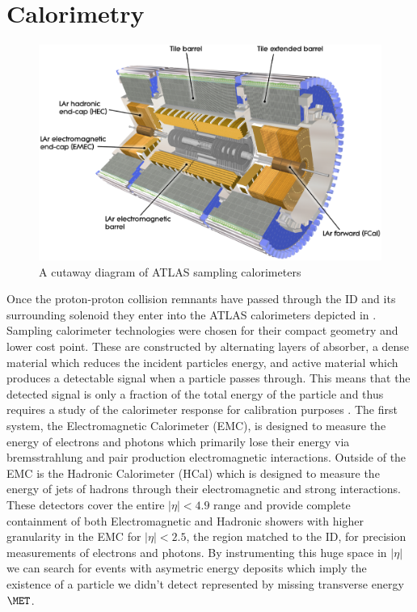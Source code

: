 \section{Calorimetry} \label{sec:atlas:calorimetry}

\begin{figure}[!htbp]
  \begin{center}
    \includegraphics[width=0.8\linewidth]{figures/atlas/calorimeter_cutaway}
    \caption{ \cite{PERF-2007-01} A cutaway diagram of ATLAS sampling calorimeters}
    \label{fig:calorimeter_cutaway}
  \end{center}
\end{figure}

Once the proton-proton collision remnants have passed through the ID and its
surrounding solenoid they enter into the ATLAS calorimeters depicted in
.  Sampling calorimeter technologies were chosen
for their compact geometry and lower cost point.  These are constructed by
alternating layers of absorber, a dense material which reduces the incident
particles energy, and active material which produces a detectable signal when a
particle passes through.  This means that the detected signal is only a fraction
of the total energy of the particle and thus requires a study of the calorimeter
response for calibration purposes \cite{Fabjan:692252}. The first system, the
Electromagnetic Calorimeter (EMC), is designed to measure the energy of
electrons and photons which primarily lose their energy via bremsstrahlung and
pair production electromagnetic interactions.  Outside of the EMC is the
Hadronic Calorimeter (HCal) which is designed to measure the energy of jets of
hadrons through their electromagnetic and strong interactions. These detectors
cover the entire $|\eta| < 4.9$ range and provide complete containment of both
Electromagnetic and Hadronic showers with higher granularity in the EMC for
$|\eta| < 2.5$, the region matched to the ID, for precision measurements of
electrons and photons.  By instrumenting this huge space in $|\eta|$ we can
search for events with asymetric energy deposits which imply the existence of a
particle we didn't detect represented by missing transverse energy $\MET$.

